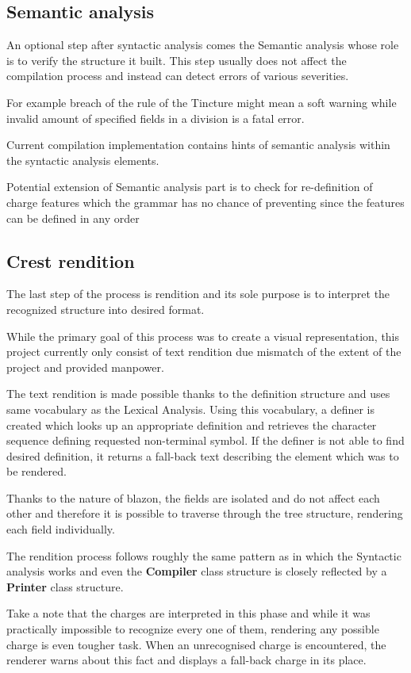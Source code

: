 \documentclass[12pt,a4paper]{article}
\begin{document}
\subsection{Semantic analysis} 
An optional step after syntactic analysis comes the Semantic analysis whose role is to verify the structure it built.
This step usually does not affect the compilation process and instead can detect errors of various severities.

For example breach of the rule of the Tincture might mean a soft warning while invalid amount of specified fields in a division is a fatal error.

Current compilation implementation contains hints of semantic analysis within the syntactic analysis elements.

Potential extension of Semantic analysis part is to check for re-definition of charge features which the grammar has no chance of preventing since the features can be defined in any order 

\subsection{Crest rendition}
The last step of the process is rendition and its sole purpose is to interpret the recognized structure into desired format.

While the primary goal of this process was to create a visual representation, this project currently only consist of text rendition due mismatch of the extent of the project and provided manpower.

The text rendition is made possible thanks to the definition structure and uses same vocabulary as the Lexical Analysis.
Using this vocabulary, a definer is created which looks up an appropriate definition and retrieves the character sequence defining requested non-terminal symbol.
If the definer is not able to find desired definition, it returns a fall-back text describing the element which was to be rendered.

Thanks to the nature of blazon, the fields are isolated and do not affect each other and therefore it is possible to traverse through the tree structure, rendering each field individually.

The rendition process follows roughly the same pattern as in which the Syntactic analysis works and even the \textbf{Compiler} class structure is closely reflected by a \textbf{Printer} class structure.

Take a note that the charges are interpreted in this phase and while it was practically impossible to recognize every one of them, rendering any possible charge is even tougher task.
When an unrecognised charge is encountered, the renderer warns about this fact and displays a fall-back charge in its place.
\end{document}
